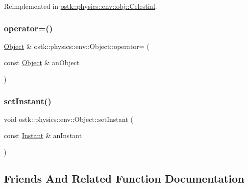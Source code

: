 Reimplemented in \hyperlink{classostk_1_1physics_1_1env_1_1obj_1_1_celestial_a611b8fe6fcd3787bbf9981ad99dfe471}{ostk\+::physics\+::env\+::obj\+::\+Celestial}.

\mbox{\label{classostk_1_1physics_1_1env_1_1_object_aebe1f6eca2d149968f496577fd291296}} 
\subsubsection{\texorpdfstring{operator=()}{operator=()}}
{\footnotesize\ttfamily \hyperlink{classostk_1_1physics_1_1env_1_1_object}{Object} \& ostk\+::physics\+::env\+::\+Object\+::operator= (\begin{DoxyParamCaption}\item[{const \hyperlink{classostk_1_1physics_1_1env_1_1_object}{Object} \&}]{an\+Object }\end{DoxyParamCaption})}

\mbox{\label{classostk_1_1physics_1_1env_1_1_object_a1cfbdcd0259692801469fbefee7790a6}} 
\subsubsection{\texorpdfstring{set\+Instant()}{setInstant()}}
{\footnotesize\ttfamily void ostk\+::physics\+::env\+::\+Object\+::set\+Instant (\begin{DoxyParamCaption}\item[{const \hyperlink{classostk_1_1physics_1_1time_1_1_instant}{Instant} \&}]{an\+Instant }\end{DoxyParamCaption})}



\subsection{Friends And Related Function Documentation}
\mbox{\label{classostk_1_1physics_1_1env_1_1_object_a418df9bf4a73078f3d494edef1743f8d}} 
